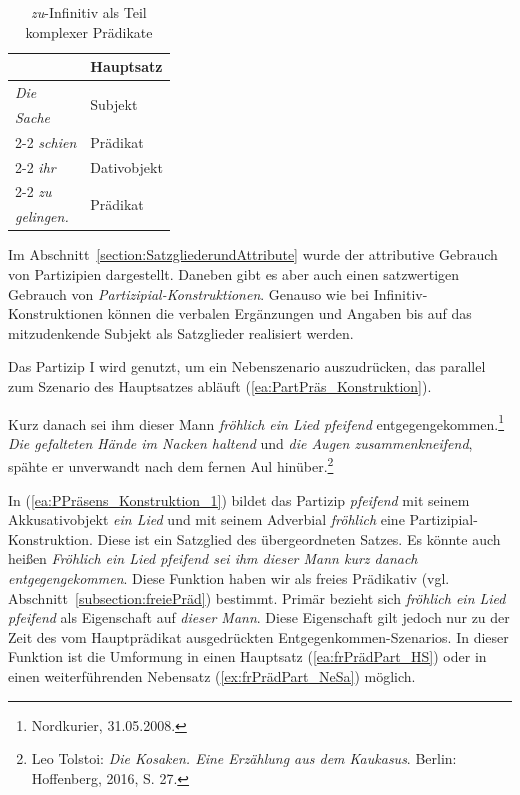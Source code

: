 \begin{table}
  \centering
  \begin{tabular}{l|l}
      &  Hauptsatz  \\
    \hline
    \textit{Die} & \multirow{2}{*}{Subjekt} \\ 
    \textit{Sache}  & \\ \cline{2-2} 
    \textit{schien} & Prädikat \\ \cline{2-2}   
    \textit{ihr} & Dativobjekt \\ \cline{2-2}
    \textit{zu} & \multirow{2}{*}{Prädikat} \\ 
    \textit{gelingen.} & \\ 
    \hline 
  \end{tabular}
  \caption{\textit{zu}-Infinitiv als Teil komplexer Prädikate}
  \label{tab:zu_Inf_komplPräd}
\end{table}

Im Abschnitt~\ref{section:SatzgliederundAttribute} wurde der attributive Gebrauch von Partizipien dargestellt. Daneben gibt es aber auch einen satzwertigen Gebrauch von \textit{Partizipial-Konstruktionen}. Genauso wie bei Infinitiv-Konstruktionen können die verbalen Ergänzungen und Angaben bis auf das mitzudenkende Subjekt als Satzglieder realisiert werden.

Das Partizip I wird genutzt, um ein Nebenszenario auszudrücken, das parallel zum Szenario des Hauptsatzes abläuft (\ref{ea:PartPräs_Konstruktion}). 

\ea \label{ea:PartPräs_Konstruktion}
\ea \label{ea:PPräsens_Konstruktion_1} Kurz danach sei ihm dieser Mann \textit{fröhlich ein Lied pfeifend} entgegengekommen.\footnote{Nordkurier, 31.05.2008.}
\ex \label{ex:PPräsens_Konstruktion_2} \textit{Die gefalteten Hände im Nacken haltend} und \textit{die Augen zusammenkneifend}, spähte er unverwandt nach dem fernen Aul hinüber.\footnote{Leo Tolstoi: \textit{Die Kosaken. Eine Erzählung aus dem Kaukasus}. Berlin: Hoffenberg, 2016, S. 27.}  
\z 
\z 

\largerpage[-1]
In (\ref{ea:PPräsens_Konstruktion_1}) bildet das Partizip \textit{pfeifend} mit seinem Akkusativobjekt \textit{ein Lied} und mit seinem Adverbial \textit{fröhlich} eine Partizipial-Konstruktion. Diese ist ein Satzglied des übergeordneten Satzes. Es könnte auch heißen \textit{Fröhlich ein Lied pfeifend sei ihm dieser Mann kurz danach entgegengekommen}. Diese Funktion haben wir als freies Prädikativ (vgl. Abschnitt~\ref{subsection:freiePräd}) bestimmt. Primär bezieht sich \textit{fröhlich ein Lied pfeifend} als Eigenschaft auf \textit{dieser Mann}. Diese Eigenschaft gilt jedoch nur zu der Zeit des vom Hauptprädikat ausgedrückten Entgegenkommen-Szenarios. In dieser Funktion ist die Umformung in einen Hauptsatz (\ref{ea:frPrädPart_HS}) oder in einen weiterführenden Nebensatz (\ref{ex:frPrädPart_NeSa}) möglich.

